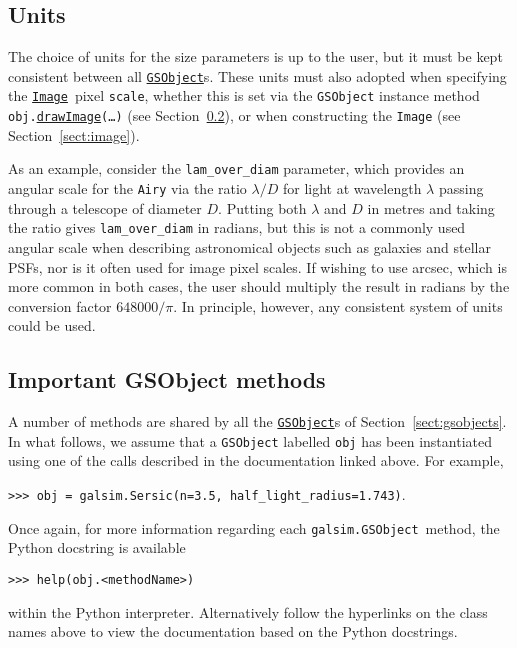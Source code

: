 \documentclass[preprint,10pt]{../../devel/modules/aastex}
\newcommand\GSObject{\href{http://galsim-developers.github.io/GalSim/classgalsim_1_1base_1_1_g_s_object.html}{\texttt{GSObject}}}
\newcommand\drawImage{\href{http://galsim-developers.github.io/GalSim/classgalsim_1_1base_1_1_g_s_object.html\#aafe6ca9d84fe81543fbc105b897273db}{\texttt{drawImage}}}
\newcommand\Image{\href{http://galsim-developers.github.io/GalSim/classgalsim_1_1image_1_1_image.html}{\texttt{Image}}}
\begin{document}
\subsection{Units}
The choice of units for the size parameters is up to the user,
but it must be kept consistent between all \GSObject s.  These
units must also adopted when specifying the \Image\ pixel
\texttt{scale}, whether this is set via the \texttt{GSObject}
instance method \texttt{obj.}\drawImage\texttt{(\dots)}
(see Section~\ref{sect:gsobjectmethods}),
or when constructing the \texttt{Image} (see Section~\ref{sect:image}).

As an example, consider the
\texttt{lam\_over\_diam} parameter, which provides an angular scale for
the \texttt{Airy} via
the ratio $\lambda / D$ for light at wavelength $\lambda$ passing
through a telescope of diameter $D$. Putting both $\lambda$ and
$D$ in metres and taking the ratio gives \texttt{lam\_over\_diam} in
radians, but this is not a commonly used angular scale when describing
astronomical objects such as galaxies and stellar PSFs, nor is
it often used for image pixel scales.  If wishing to use arcsec, which
is more common in both cases, the user should multiply the result in
radians by the conversion factor
$648000 / \pi$.  In principle, however, any consistent
system of units could be used.


\subsection{Important GSObject methods}\label{sect:gsobjectmethods}
A number of methods are shared by all the \GSObject s of
Section~\ref{sect:gsobjects}.
In what follows, we assume that a
\texttt{GSObject} labelled \texttt{obj} has been instantiated using
one of the calls described in the documentation linked above.  For
example,

\texttt{>>> obj = galsim.Sersic(n=3.5, half\_light\_radius=1.743)}.

Once again, for more information regarding each \texttt{galsim.GSObject}~method,
the Python docstring is available

\texttt{>>> help(obj.<methodName>)}

within the Python interpreter.  Alternatively follow the hyperlinks on
the class names above to view the documentation based
on the Python docstrings.
\end{document}
